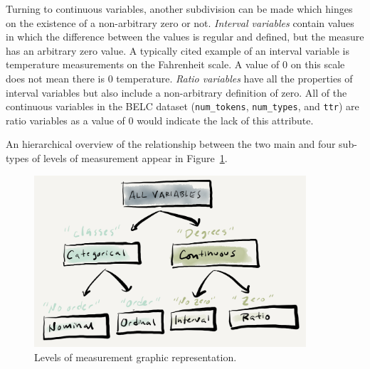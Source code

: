 \documentclass[
  letterpaper,
]{latex/krantz}
\begin{document}
Turning to continuous variables, another subdivision can be made which
hinges on the existence of a non-arbitrary zero or not. \emph{Interval
variables} contain values in which the difference between the values is
regular and defined, but the measure has an arbitrary zero value. A
typically cited example of an interval variable is temperature
measurements on the Fahrenheit scale. A value of 0 on this scale does
not mean there is 0 temperature. \emph{Ratio variables} have all the
properties of interval variables but also include a non-arbitrary
definition of zero. All of the continuous variables in the BELC dataset
(\texttt{num\_tokens}, \texttt{num\_types}, and \texttt{ttr}) are ratio
variables as a value of 0 would indicate the lack of this attribute.

An hierarchical overview of the relationship between the two main and
four sub-types of levels of measurement appear in
Figure~\ref{fig-info-values}.

\begin{figure}

{\centering \includegraphics[width=0.9\textwidth,height=\textheight]{./figures/approaching-analysis/Informational-values-paper.png}

}

\caption{\label{fig-info-values}Levels of measurement graphic
representation.}

\end{figure}
\end{document}
